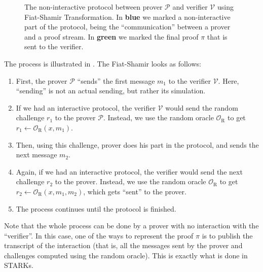 \documentclass[../lecture-notes.tex]{subfiles}
\begin{document}
\begin{figure}[H]

    \caption{The non-interactive protocol between prover $\mathcal{P}$ and verifier $\mathcal{V}$ using Fiat-Shamir Transformation. In \textcolor{blue!90!black}{\textbf{blue}} we marked a non-interactive part of the protocol, being the ``communication'' between a prover and a proof stream. In \textcolor{green!50!black}{\textbf{green}} we marked the final proof $\pi$ that is sent to the verifier.}
    \label{fig:fiat-shamir}
\end{figure}

The process is illustrated in . The Fiat-Shamir looks as follows:
\begin{enumerate}
    \item First, the prover $\mathcal{P}$ ``sends'' the first message $m_1$ to the verifier $\mathcal{V}$. Here, ``sending'' is not an actual sending, but rather its simulation.
    \item If we had an interactive protocol, the verifier $\mathcal{V}$ would send the random challenge $r_1$ to the prover $\mathcal{P}$. Instead, we use the random oracle $\mathcal{O}_{\text{R}}$ to get $r_1 \gets \mathcal{O}_{\text{R}}(x,m_1)$.
    \item Then, using this challenge, prover does his part in the protocol, and sends the next message $m_2$. 
    \item Again, if we had an interactive protocol, the verifier would send the next challenge $r_2$ to the prover. Instead, we use the random oracle $\mathcal{O}_{\text{R}}$ to get $r_2 \gets \mathcal{O}_{\text{R}}(x,m_1,m_2)$, which gets ``sent'' to the prover.
    \item The process continues until the protocol is finished.
\end{enumerate}

Note that the whole process can be done by a prover with no interaction with the ``verifier''. In this case, one of the ways to represent the proof $\pi$ is to publish the transcript of the interaction (that is, all the messages sent by the prover and challenges computed using the random oracle). This is exactly what is done in STARKs.
\end{document}
